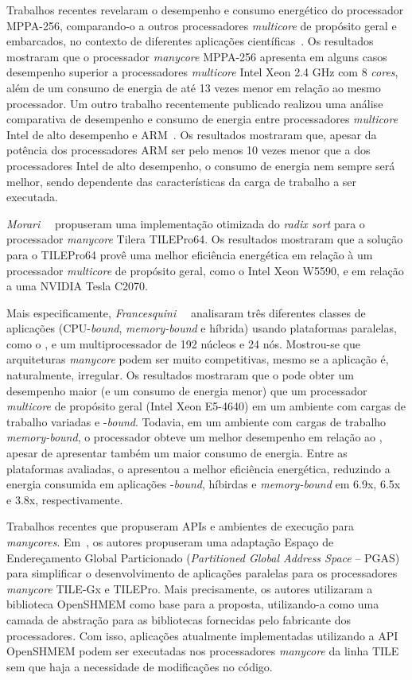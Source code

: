 Trabalhos recentes revelaram o desempenho e consumo energético do processador
MPPA-256, comparando-o a outros processadores \textit{multicore} de propósito
geral e embarcados, no contexto de diferentes aplicações
científicas~\cite{Castro-SBAC-PAD:2014,Castro-IA3:2013,Castro-IA3-JPDC:2014}. Os
resultados mostraram que o processador \emph{manycore} MPPA-256 apresenta em
alguns casos desempenho superior a processadores \emph{multicore} Intel Xeon 2.4
GHz com 8 \emph{cores}, além de um consumo de energia de até 13 vezes menor em
relação ao mesmo processador. Um outro trabalho recentemente publicado realizou
uma análise comparativa de desempenho e consumo de energia entre processadores
\emph{multicore} Intel de alto desempenho e ARM~\cite{Castro-Padoin-IET:2015}.
Os resultados mostraram que, apesar da potência dos processadores ARM ser pelo
menos 10 vezes menor que a dos processadores Intel de alto desempenho, o consumo
de energia nem sempre será melhor, sendo dependente das características da carga
de trabalho a ser executada.

\emph{Morari}~\etal~\cite{Valero:2012} propuseram uma implementação otimizada do
\textit{radix sort} para o processador \textit{manycore} Tilera TILEPro64. Os
resultados mostraram que a solução para o TILEPro64 provê uma melhor eficiência
energética em relação à um processador \textit{multicore} de propósito geral, como
o Intel Xeon W5590, e em relação a uma \gpu NVIDIA Tesla C2070.

Mais especificamente, \emph{Francesquini}~\etal~\cite{Castro-IA3-JPDC:2014} analisaram
três diferentes classes de aplicações (CPU-\textit{bound}, \textit{memory-bound}
e híbrida) usando plataformas paralelas, como o \mppa, e um multiprocessador \numa de
192 núcleos e 24 nós. Mostrou-se que arquiteturas \textit{manycore} podem ser muito
competitivas, mesmo se a aplicação é, naturalmente, irregular. Os resultados mostraram
que o \mppa pode obter um desempenho maior (e um consumo de energia menor) que um
processador \textit{multicore} de propósito geral (Intel Xeon E5-4640) em um ambiente
com cargas de trabalho variadas e \cpu{}-\textit{bound}. Todavia, em um ambiente com cargas
de trabalho \textit{memory-bound}, o processador \numa obteve um melhor desempenho
em relação ao \mppa, apesar de apresentar também um maior consumo de energia.
Entre as plataformas avaliadas, o \mppa apresentou a melhor eficiência
energética, reduzindo a energia consumida em aplicações \cpu{}-\textit{bound},
híbirdas e \textit{memory-bound} em 6.9x, 6.5x e 3.8x, respectivamente.

Trabalhos recentes que propuseram APIs e ambientes de execução para
\emph{manycores}. Em~\cite{TSHMEM:2013}, os autores propuseram uma adaptação
Espaço de Endereçamento Global Particionado (\emph{Partitioned Global Address
    Space} -- PGAS) para simplificar o desenvolvimento de aplicações paralelas
para os processadores \emph{manycore} TILE-Gx e TILEPro. Mais precisamente, os
autores utilizaram a biblioteca OpenSHMEM como base para a proposta,
utilizando-a como uma camada de abstração para as bibliotecas fornecidas pelo
fabricante dos processadores. Com isso, aplicações atualmente implementadas
utilizando a API OpenSHMEM podem ser executadas nos processadores
\emph{manycore} da linha TILE sem que haja a necessidade de modificações no
código.

